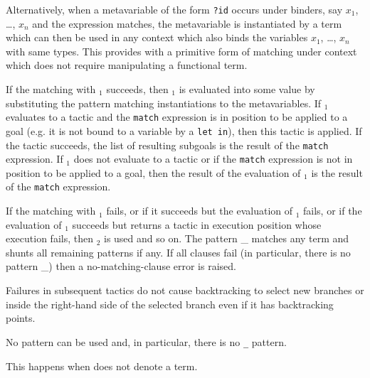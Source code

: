 Alternatively, when a metavariable of the form {\tt ?id} occurs under
binders, say $x_1$, \ldots, $x_n$ and the expression matches, the
metavariable is instantiated by a term which can then be used in any
context which also binds the variables $x_1$, \ldots, $x_n$ with
same types. This provides with a primitive form of matching
under context which does not require manipulating a functional term.

If the matching with {\cpattern}$_1$ succeeds, then {\tacexpr}$_1$ is
evaluated into some value by substituting the pattern matching
instantiations to the metavariables. If {\tacexpr}$_1$ evaluates to a
tactic and the {\tt match} expression is in position to be applied to
a goal (e.g. it is not bound to a variable by a {\tt let in}), then
this tactic is applied. If the tactic succeeds, the list of resulting
subgoals is the result of the {\tt match} expression. If
{\tacexpr}$_1$ does not evaluate to a tactic or if the {\tt match}
expression is not in position to be applied to a goal, then the result
of the evaluation of {\tacexpr}$_1$ is the result of the {\tt match}
expression.

If the matching with {\cpattern}$_1$ fails, or if it succeeds but the
evaluation of {\tacexpr}$_1$ fails, or if the evaluation of
{\tacexpr}$_1$ succeeds but returns a tactic in execution position
whose execution fails, then {\cpattern}$_2$ is used and so on.  The
pattern {\_} matches any term and shunts all remaining patterns if
any. If all clauses fail (in particular, there is no pattern {\_})
then a no-matching-clause error is raised.

Failures in subsequent tactics do not cause backtracking to select new
branches or inside the right-hand side of the selected branch even if
it has backtracking points.

\begin{ErrMsgs}

\item {}

  No pattern can be used and, in particular, there is no {\tt \_} pattern.

\item {}

  This happens when {\tacexpr} does not denote a term.

\end{ErrMsgs}

